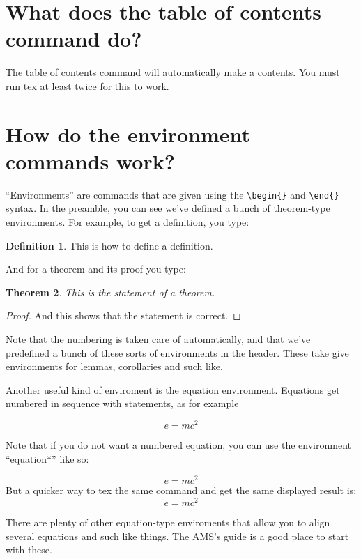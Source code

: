 \documentclass[psamsfonts]{amsart}
\newtheorem{thm}{Theorem}[section]
\theoremstyle{definition}
\newtheorem{defn}[thm]{Definition}
\theoremstyle{remark}
\numberwithin{equation}{section}
\begin{document}
\section{What does the table of contents command do?}

The table of contents command will automatically make a contents.
You must run tex at least twice for this to work.

\section{How do the environment commands work?}

``Environments'' are commands that are given using the \verb|\begin{}|
  and \verb|\end{}| syntax. In the preamble, you can see we've defined
  a bunch of theorem-type environments.  For example, to get a definition, 
you type:

\begin{defn}  This is how to define a definition.
\end{defn}

And for a theorem and its proof you type:

\begin{thm}
This is the statement of a theorem.
\end{thm}
\begin{proof}
And this shows that the statement is correct.
\end{proof}

Note that the numbering is taken care of automatically, and that we've predefined a bunch of these sorts of environments in the header.  These take give environments for  lemmas, corollaries and such like. 

Another useful kind of enviroment is the equation environment.  Equations
get numbered in sequence with statements, as for example

\begin{equation}  e = mc^2
\end{equation}

Note that if you do not want a numbered equation, you can use the
environment ``equation*''
 like so:

\begin{equation*}
e=mc^2
\end{equation*}
But a quicker way to tex the same command and get the same displayed result is:
\[  e=mc^2 \]

There are plenty of other equation-type enviroments that allow you to
align several equations and such like things. The AMS's guide \cite{amsshort} is a
good place to start with these.
\end{document}
